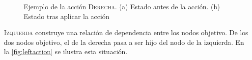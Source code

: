 \begin{figure}[ht]
  \centering
  \begin{subfigure}[b]{0.3\textwidth}
    \caption{}
  \end{subfigure}
  \qquad\qquad
  \centering
  \begin{subfigure}[b]{0.3\textwidth}
    \caption{}
  \end{subfigure}
  \caption{Ejemplo de la acción \textsc{Derecha}. (a) Estado antes de la
    acción. (b) Estado tras aplicar la acción}
  \label{fig:rightaction}
\end{figure}
\textsc{Izquierda} construye una relación de dependencia entre los nodos
objetivo. De los dos nodos objetivo, el de la derecha pasa a ser hijo del nodo
de la izquierda. En la \autoref{fig:leftaction} se ilustra esta situación.
